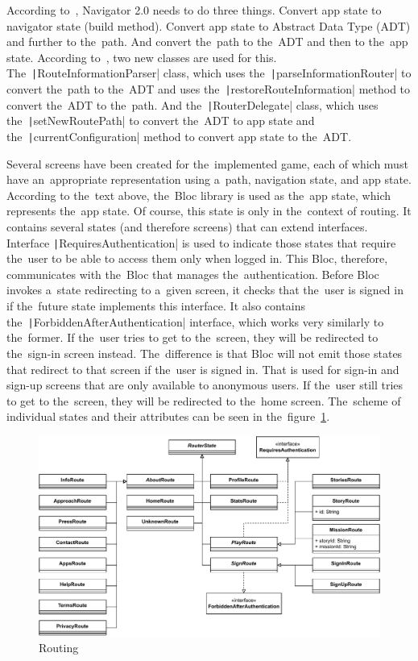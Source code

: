According to~\cite{kietay_2021_navigator}, Navigator 2.0 needs to do three things.
Convert app state to navigator state (build method).
Convert app state to Abstract Data Type (ADT) and further to the~path.
And convert the~path to the~ADT and then to the~app state.
According to~\cite{ryan_2020_navigator}, two new classes are used for this.
The~\texttt|RouteInformationParser| class, which uses the~\texttt|parseInformationRouter| to convert the~path to the~ADT and uses the~\texttt|restoreRouteInformation| method to convert the~ADT to the~path.
And the~\texttt|RouterDelegate| class, which uses the~\texttt|setNewRoutePath| to convert the~ADT to app state and the~\texttt|currentConfiguration| method to convert app state to the~ADT.

Several screens have been created for the~implemented game, each of which must have an~appropriate representation using a~path, navigation state, and app state.
According to the~text above, the~Bloc library is used as the~app state, which represents the~app state.
Of course, this state is only in the~context of routing.
It contains several states (and therefore screens) that can extend interfaces.
Interface \texttt|RequiresAuthentication| is used to indicate those states that require the~user to be able to access them only when logged in.
This Bloc, therefore, communicates with the~Bloc that manages the~authentication.
Before Bloc invokes a~state redirecting to a~given screen, it checks that the~user is signed in if the~future state implements this interface.
It also contains the~\texttt|ForbiddenAfterAuthentication| interface, which works very similarly to the~former.
If the~user tries to get to the~screen, they will be redirected to the~sign-in screen instead.
The~difference is that Bloc will not emit those states that redirect to that screen if the~user is signed in.
That is used for sign-in and sign-up screens that are only available to anonymous users.
If the~user still tries to get to the~screen, they will be redirected to the~home screen.
The~scheme of individual states and their attributes can be seen in the~figure~\ref{fig:routing}.

\begin{figure}
    \centering
    \includegraphics[width=1\linewidth]{assets/implementation/routing.pdf}
    \caption{Routing}
    \label{fig:routing}
\end{figure}

